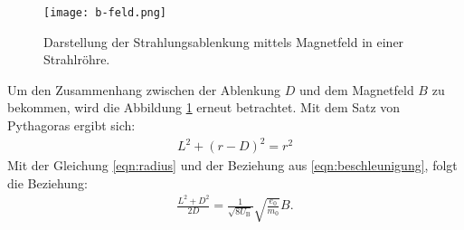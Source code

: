 \begin{figure}
\centering
\texttt{[image: b-feld.png]}
\caption{Darstellung der Strahlungsablenkung mittels Magnetfeld in einer Strahlröhre.\cite{sample2}}
\label{fig:kreis}
\end{figure}

Um den Zusammenhang zwischen der Ablenkung $D$ und dem Magnetfeld $B$ zu bekommen, wird die Abbildung \ref{fig:kreis} erneut betrachtet.
Mit dem Satz von Pythagoras ergibt sich:
\begin{align}
L^2+(r-D)^2=r^2
\end{align}
Mit der Gleichung \eqref{eqn:radius} und der Beziehung aus \eqref{eqn:beschleunigung}, folgt die Beziehung:
\begin{align}
\frac{L^2+D^2}{2D}=\frac{1}{\sqrt{8U_\mathrm{B}}}\sqrt{\frac{e_\mathrm{0}}{m_\mathrm{0}}}B.\label{eqn:B}
\end{align}

